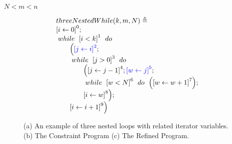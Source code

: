     $N < m < n$\\
    { \footnotesize
    \begin{figure}
    \centering
    \begin{subfigure}{.3\textwidth}
      \[
        \begin{array}{l}
            \kw{threeNestedWhile}(k, m, N) \triangleq \\
            \clabel{ \assign{i}{0} }^{0} ; \\
                \ewhile ~ \clabel{i < k}^{1} ~ \edo ~ \\
                \qquad \Big(
                 \highlight{\clabel{\assign{j}{i}}^{2}} ;\\
                 \qquad \ewhile ~ \clabel{j > 0}^{3} ~ \edo ~ \\
                 \qquad \qquad \Big(
                  \clabel{\assign{j}{j-1}}^{4};
                  \highlight{\clabel{\assign{w}{j}}^{5}};\\
                  \qquad \qquad \ewhile ~ \clabel{w < N}^{6} ~ \edo ~
                  \Big(
                    \clabel{\assign{w}{w + 1}}^{7}
                      \Big); \\
                      \qquad \qquad \clabel{\assign{i}{w}}^{8}
                      \Big); \\
                      \qquad \clabel{\assign{i}{i+1}}^{9}
                  \Big)
            \end{array}
        \]
    \end{subfigure}
    \begin{subfigure}{.3\textwidth}
        \begin{centering}
        \begin{tikzpicture}[scale=\textwidth/15cm,samples=200]
    \end{tikzpicture}
    \caption{}
    \end{centering}
    \end{subfigure}
            \begin{subfigure}{.3\textwidth}
                \begin{centering}
                \begin{tikzpicture}[scale=\textwidth/11cm,samples=200]
             \end{tikzpicture}
             \caption{}
                \end{centering}
                \end{subfigure}
    \caption{
    (a) An example of three nested loops with related iterator variables.
    (b) The Constraint Program
    (c) The Refined Program.}
        \label{fig:threeWhile}
    \end{figure}
    }